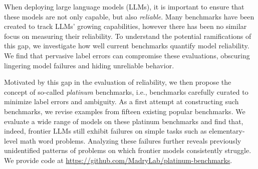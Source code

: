 When deploying large language models (LLMs), it is important to ensure that these models are not only capable, but also \textit{reliable}.
Many benchmarks have been created to track LLMs' growing capabilities, however there has been no similar focus on measuring their reliability.
To understand the potential ramifications of this gap, %
we investigate how well current benchmarks quantify model reliability. We find that pervasive label errors can compromise these evaluations, obscuring lingering model failures and hiding unreliable behavior.




Motivated by this gap in the evaluation of reliability, we then propose the concept of so-called \textit{platinum} benchmarks, i.e., benchmarks carefully curated to minimize label errors and ambiguity.
As a first attempt at constructing such benchmarks, we revise examples from fifteen existing popular benchmarks.
We evaluate a wide range of models on these platinum benchmarks and find that, indeed, frontier LLMs still exhibit failures on simple tasks such as elementary-level math word problems. Analyzing these failures further reveals previously unidentified patterns of problems on which frontier models consistently struggle. We provide code at \url{https://github.com/MadryLab/platinum-benchmarks}.










